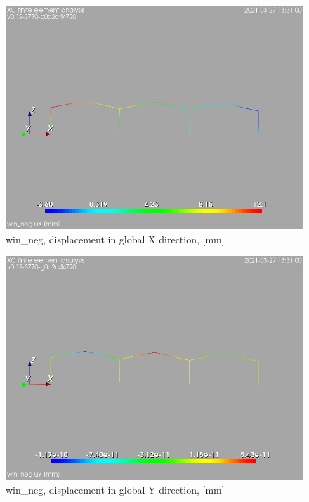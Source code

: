 \cleardoublepage
\begin{figure}
\begin{center}
\includegraphics[width=\linewidth]{calc_results/sole_zeinali/text/graphics/resSimplLC/win_negtotaluX}
\caption{win_neg, displacement in global X direction, [mm]}
\end{center}
\end{figure}
\begin{figure}
\begin{center}
\includegraphics[width=\linewidth]{calc_results/sole_zeinali/text/graphics/resSimplLC/win_negtotaluY}
\caption{win_neg, displacement in global Y direction, [mm]}
\end{center}
\end{figure}
